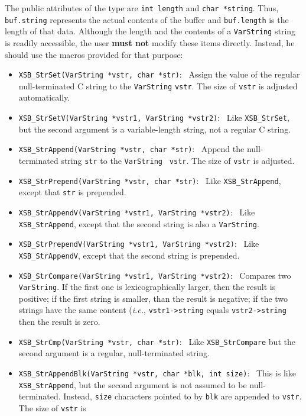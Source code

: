 The public attributes of the type are {\tt int length} and {\tt char *string}.
Thus, {\tt buf.string} represents the actual contents of the buffer and
{\tt buf.length} is the length of that data. Although the length and the
contents of a {\tt VarString} string is readily accessible, the user {\bf must
not} modify these items directly. Instead, he should use the macros
provided for that purpose:
\begin{itemize}
  \item {\tt XSB\_StrSet(VarString *vstr, char *str)}:~
    Assign the value of the regular null-terminated C string to the
    {\tt VarString} {\tt vstr}. The size of {\tt vstr} is adjusted
    automatically.
  \item {\tt XSB\_StrSetV(VarString *vstr1, VarString *vstr2)}:~
    Like {\tt XSB\_StrSet}, but the second argument is a variable-length
    string, not a regular C string.
  \item {\tt XSB\_StrAppend(VarString *vstr, char *str)}:~
    Append the null-terminated string {\tt str} to the {\tt VarString} {\tt
      vstr}. The size of {\tt vstr} is adjusted.
  \item {\tt XSB\_StrPrepend(VarString *vstr, char *str)}:~
    Like {\tt XSB\_StrAppend}, except that {\tt str} is prepended.
  \item {\tt XSB\_StrAppendV(VarString *vstr1, VarString *vstr2)}:~
    Like {\tt XSB\_StrAppend}, except that the second string is also a
    {\tt VarString}.
  \item {\tt XSB\_StrPrependV(VarString *vstr1, VarString *vstr2)}:~
    Like {\tt XSB\_StrAppendV}, except that the second string is prepended.
  \item {\tt XSB\_StrCompare(VarString *vstr1, VarString *vstr2)}:~
    Compares two {\tt VarString}. If the first one is lexicographically
    larger, then the result is positive; if the first string is smaller,
    than the result is negative; if the two strings have the same content
    ({\it i.e.}, {\tt vstr1->string} equals {\tt vstr2->string} then the
    result is zero.
  \item {\tt XSB\_StrCmp(VarString *vstr, char *str)}:~
    Like {\tt XSB\_StrCompare} but the second argument is a regular,
    null-terminated string.
  \item {\tt XSB\_StrAppendBlk(VarString *vstr, char *blk, int size)}:~
    This is like {\tt XSB\_StrAppend}, but the second argument is not assumed
    to be null-terminated. Instead, {\tt size} characters pointed to by
    {\tt blk} are appended to {\tt vstr}. The size of {\tt vstr} is

\end{itemize}
